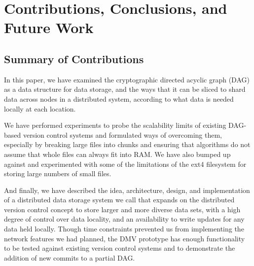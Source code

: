 \chapter{Contributions, Conclusions, and Future Work}

\section{Summary of Contributions}

In this paper, we have examined the cryptographic directed acyclic graph (DAG)
as a data structure for data storage, and the ways that it can be sliced to
shard data across nodes in a distributed system, according to what data is
needed locally at each location.

We have performed experiments to probe the scalability limits of existing
DAG-based version control systems and formulated ways of overcoming them,
especially by breaking large files into chunks and ensuring that algorithms do
not assume that whole files can always fit into RAM. We have also bumped up
against and experimented with some of the limitations of the ext4 filesystem for
storing large numbers of small files.

And finally, we have described the idea, architecture, design, and
implementation of a distributed data storage system we call  that expands on the distributed version control concept
to store larger and more diverse data sets, with a high degree of control over
data locality, and an availability to write updates for any data held locally.
Though time constraints prevented us from implementing the network features we
had planned, the DMV prototype has enough functionality to be tested against
existing version control systems and to demonstrate the addition of new
\glspl{commit} to a partial DAG.
